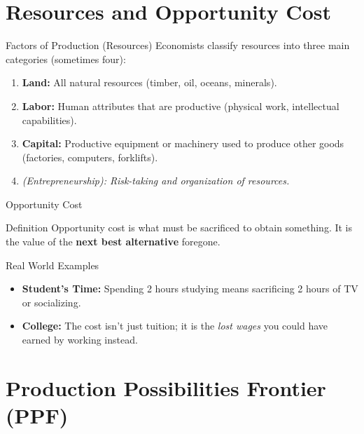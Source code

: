 \documentclass{beamer}
\begin{document}
\section{Resources and Opportunity Cost}

\begin{frame}{Factors of Production (Resources)}
    Economists classify resources into three main categories (sometimes four):
    
    \begin{enumerate}
        \item \textbf{Land:} All natural resources (timber, oil, oceans, minerals).
        \item \textbf{Labor:} Human attributes that are productive (physical work, intellectual capabilities).
        \item \textbf{Capital:} Productive equipment or machinery used to produce other goods (factories, computers, forklifts).
        \item \textit{(Entrepreneurship): Risk-taking and organization of resources.}
    \end{enumerate}
\end{frame}

\begin{frame}{Opportunity Cost}
    \begin{block}{Definition}
        Opportunity cost is what must be sacrificed to obtain something. It is the value of the \textbf{next best alternative} foregone.
    \end{block}

    \begin{exampleblock}{Real World Examples}
        \begin{itemize}
            \item \textbf{Student's Time:} Spending 2 hours studying means sacrificing 2 hours of TV or socializing.
            \item \textbf{College:} The cost isn't just tuition; it is the \textit{lost wages} you could have earned by working instead.
        \end{itemize}
    \end{exampleblock}
\end{frame}

\section{Production Possibilities Frontier (PPF)}
\end{document}
